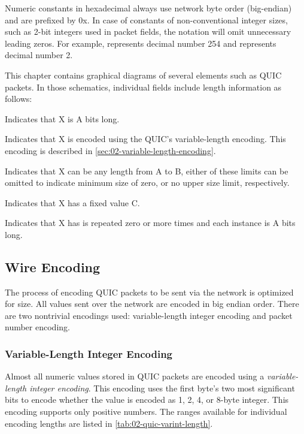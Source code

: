 Numeric constants in hexadecimal always use network byte order (big-endian) and are prefixed by 0x.
In case of constants of non-conventional integer sizes, such as 2-bit integers used in packet
fields, the notation will omit unnecessary leading zeros. For example,  represents
decimal number 254 and  represents decimal number 2.

This chapter contains graphical diagrams of several elements such as QUIC packets. In those
schematics, individual fields include length information as follows:

\begin{itemize}

   Indicates that X is A bits long.

   Indicates that X is encoded using the QUIC's variable-length encoding. This encoding is described in \autoref{sec:02-variable-length-encoding}.

   Indicates that X can be any length from A to B, either of these limits can be omitted to indicate minimum size of zero, or no upper size limit, respectively.

   Indicates that X has a fixed value C.

   Indicates that X has is repeated zero or more times and each instance is A bits long.

\end{itemize}

\subsection{Wire Encoding}\label{sec:02-wire-encoding}

The process of encoding QUIC packets to be sent via the network is optimized for size. All values
sent over the network are encoded in big endian order. There are two nontrivial encodings used:
variable-length integer encoding and packet number encoding.

\subsubsection{Variable-Length Integer Encoding}\label{sec:02-variable-length-encoding}

Almost all numeric values stored in QUIC packets are encoded using a \textit{variable-length integer
  encoding}. This encoding uses the first byte's two most significant bits to encode whether the
value is encoded as 1, 2, 4, or 8-byte integer. This encoding supports only positive numbers. The
ranges available for individual encoding lengths are listed in \autoref{tab:02-quic-varint-length}.

